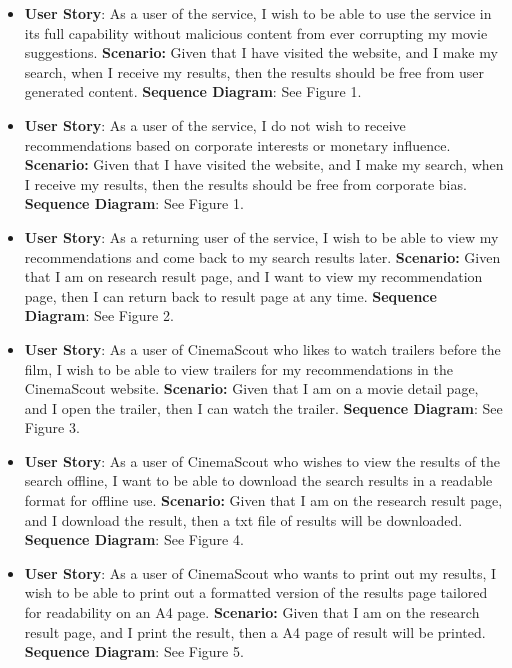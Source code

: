 \documentclass{article}
\begin{document}
\begin{itemize}
\item \textbf{User Story}: As a user of the service, I wish to be able to use 
the service in its full capability without malicious content from ever 
corrupting my movie suggestions.
\newline \textbf {Scenario:}  Given that I have visited the website, and I make my search, when I receive my results, then the results should be free from user generated content.
\newline\textbf{Sequence Diagram}: See Figure 1.

\item \textbf{User Story}: As a user of the service, I do not wish to receive
recommendations based on corporate interests or monetary influence.
\newline \textbf {Scenario:} Given that I have visited the website, and I make my search, when I receive my results, then the results should be free from corporate bias.
\newline\textbf{Sequence Diagram}: See Figure 1.

\item \textbf{User Story}: As a returning user of the service, I wish to be able
to view my recommendations and come back to my search results later.
\newline \textbf {Scenario:} Given that I am on research result page, and I want to view my recommendation page, then I can return back to result page at any time.
\newline\textbf{Sequence Diagram}: See Figure 2.

\item \textbf{User Story}: As a user of CinemaScout who likes to watch trailers
before the film, I wish to be able to view trailers for my recommendations
in the CinemaScout website.
\newline \textbf {Scenario:} Given that I am on a movie detail page, and I open the trailer, then I can watch the trailer.
\newline\textbf{Sequence Diagram}: See Figure 3.

\item \textbf{User Story}: As a user of CinemaScout who wishes to view
the results of the search offline, I want to be able to download the search
results in a readable format for offline use.
\newline \textbf {Scenario:} Given that I am on the research result page, and I download the result, then a txt file of results will be downloaded.
\newline\textbf{Sequence Diagram}: See Figure 4.

\item \textbf{User Story}: As a user of CinemaScout who wants to print out my
results, I wish to be able to print out a formatted version of the results page
tailored for readability on an A4 page.
\newline \textbf {Scenario:} Given that I am on the research result page, and I print the result, then a A4 page of result will be printed.
\newline\textbf{Sequence Diagram}: See Figure 5.

\end{itemize}
\end{document}
